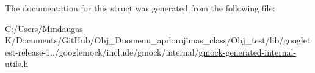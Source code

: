 The documentation for this struct was generated from the following file\+:\begin{DoxyCompactItemize}
\item 
C\+:/\+Users/\+Mindaugas K/\+Documents/\+Git\+Hub/\+Obj\+\_\+\+Duomenu\+\_\+apdorojimas\+\_\+class/\+Obj\+\_\+test/lib/googletest-\/release-\/1../googlemock/include/gmock/internal/\mbox{\hyperlink{gmock-generated-internal-utils_8h}{gmock-\/generated-\/internal-\/utils.\+h}}\end{DoxyCompactItemize}
